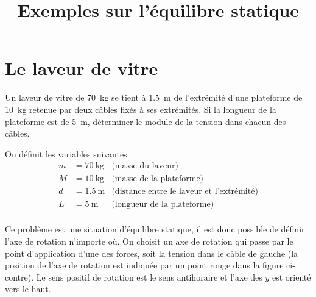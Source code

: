 \documentclass{tufte-handout}
\title{Exemples sur l'équilibre statique}
\date{}
\begin{document}
\maketitle
\vspace{0.5cm}

\section{Le laveur de vitre}

Un laveur de vitre de \SI{70}{\kilogram} se tient à \SI{1.5}{\meter} de
l'extrémité d'une plateforme de \SI{10}{\kilogram} retenue par deux câbles
fixés à ses extrémités.  Si la longueur de la plateforme est de \SI{5}{\meter},
déterminer le module de la tension dans chacun des câbles.

On définit les variables suivantes
\begin{align*}
  m &= \SI{70}{\kilogram}  & \text{(masse du laveur)} \\
  M &= \SI{10}{\kilogram}  & \text{(masse de la plateforme)} \\ 
  d &= \SI{1.5}{\meter}  & \text{(distance entre le laveur et l'extrémité)} \\ 
  L &= \SI{5}{\meter}  & \text{(longueur de la plateforme)} \\ 
\end{align*}

Ce problème est une situation d'équilibre statique, il est donc possible de
définir l'axe de rotation n'importe où.  On choisit un axe de rotation qui
passe par le point d'application d'une des forces, soit la tension dans le
câble de gauche (la position de l'axe de rotation est indiquée par un point
rouge dans la figure ci-contre).  Le sens positif de rotation est le sens
antihoraire et l'axe des $y$ est orienté vers le haut.

\begin{marginfigure}
  \begin{center}
  \end{center}
\end{marginfigure}
\end{document}
